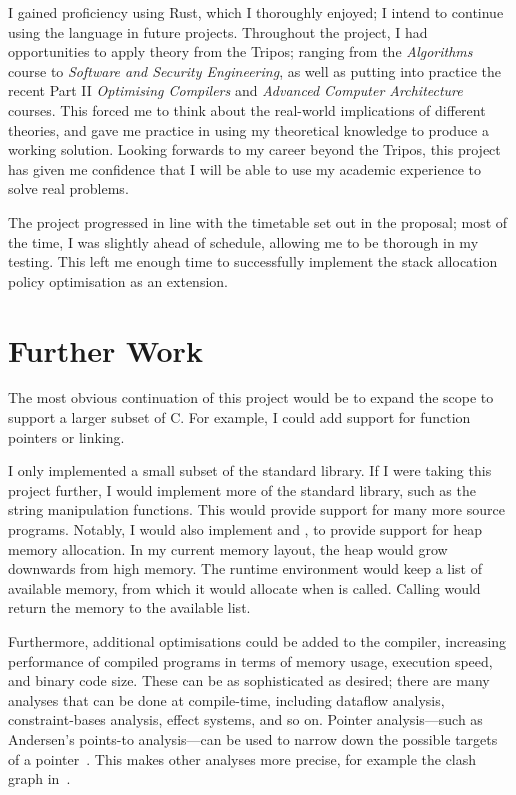 \documentclass[00-main.tex]{subfiles}
\begin{document}
I gained proficiency using Rust, which I thoroughly enjoyed; I intend to continue using the language in future projects.
Throughout the project, I had opportunities to apply theory from the Tripos; ranging from the \emph{Algorithms} course to \emph{Software and Security Engineering}, as well as putting into practice the recent Part II \emph{Optimising Compilers} and \emph{Advanced Computer Architecture} courses.
This forced me to think about the real-world implications of different theories, and gave me practice in using my theoretical knowledge to produce a working solution.
Looking forwards to my career beyond the Tripos, this project has given me confidence that I will be able to use my academic experience to solve real problems.

The project progressed in line with the timetable set out in the proposal; most of the time, I was slightly ahead of schedule, allowing me to be thorough in my testing.
This left me enough time to successfully implement the stack allocation policy optimisation as an extension.

\section{Further Work}

The most obvious continuation of this project would be to expand the scope to support a larger subset of C.
For example, I could add support for function pointers or linking.

I only implemented a small subset of the standard library.
If I were taking this project further, I would implement more of the standard library, such as the string manipulation functions.
This would provide support for many more source programs.
Notably, I would also implement  and , to provide support for heap memory allocation.
In my current memory layout, the heap would grow downwards from high memory.
The runtime environment would keep a list of available memory, from which it would allocate when  is called.
Calling  would return the memory to the available list.

Furthermore, additional optimisations could be added to the compiler, increasing performance of compiled programs in terms of memory usage, execution speed, and binary code size.
These can be as sophisticated as desired; there are many analyses that can be done at compile-time, including dataflow analysis, constraint-bases analysis, effect systems, and so on.
Pointer analysis---such as Andersen's points-to analysis---can be used to narrow down the possible targets of a pointer~.
This makes other analyses more precise, for example the clash graph in~.
\end{document}
